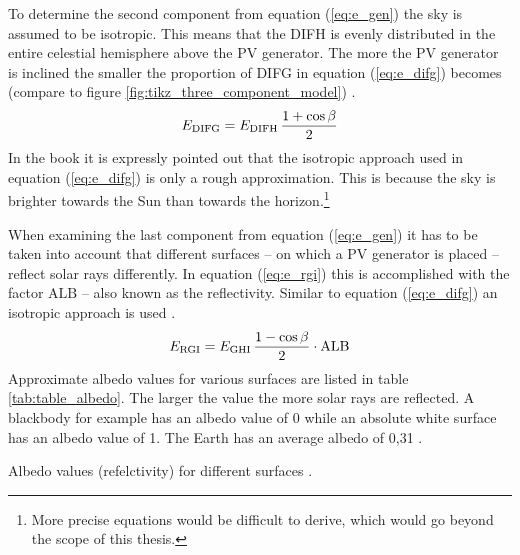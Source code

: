 To determine the second component from equation (\ref{eq:e_gen}) the sky is assumed to be isotropic. This means that the DIFH is evenly distributed in the entire celestial hemisphere above the PV generator. The more the PV generator is inclined the smaller the proportion of DIFG in equation (\ref{eq:e_difg}) becomes (compare to figure \ref{fig:tikz_three_component_model}) \cite{Landis:1995, Mertens:2015}. 
	\begin{equation} \label{eq:e_difg}
	\centering
		E_{\mathrm{DIFG}} = E_{\mathrm{DIFH}} \, \frac{1 + \cos \beta }{2}
	\end{equation} 
In the book \cite{Mertens:2015} it is expressly pointed out that the isotropic approach used in equation (\ref{eq:e_difg}) is only a rough approximation. This is because the sky is brighter towards the Sun than towards the horizon.\footnote{More precise equations would be difficult to derive, which would go beyond the scope of this thesis.} 

When examining the last component from equation (\ref{eq:e_gen}) it has to be taken into account that different surfaces -- on which a PV generator is placed -- reflect solar rays differently. In equation (\ref{eq:e_rgi}) this is accomplished with the factor $\mathrm{ALB}$ -- also known as the reflectivity. Similar to equation (\ref{eq:e_difg}) an isotropic approach is used \cite{Landis:1995, Dobos:2011, Mertens:2015, Bralower:2018}. 
	\begin{equation} \label{eq:e_rgi}
	\centering
		E_{\mathrm{RGI}} = E_{\mathrm{GHI}} \, \frac{1 - \cos \beta }{2} \cdot \mathrm{ALB}
	\end{equation}
Approximate albedo values for various surfaces are listed in table \ref{tab:table_albedo}. The larger the value the more solar rays are reflected. A blackbody for example has an albedo value of 0 while an absolute white surface has an albedo value of 1. The Earth has an average albedo of 0,31 \cite{Bennett:2010, Dobos:2011, Bralower:2018}.
\begin{table}[h!]
	\centering
	
	\caption{Albedo values (refelctivity) for different surfaces \cite{Dobos:2011, Bertol:2011, Mertens:2015, Bralower:2018}.}
	\label{tab:table_albedo}
\end{table}

